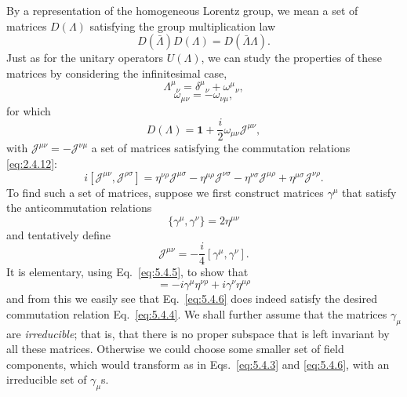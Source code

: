 By a representation of the homogeneous Lorentz group, we mean a set of
matrices $D(\Lambda)$ satisfying the group multiplication law
\[
D(\bar\Lambda)D(\Lambda)=D(\bar\Lambda\Lambda).
\]
Just as for the unitary operators $U(\Lambda)$, we can study the properties of
these matrices by considering the infinitesimal case,
\begin{equation}
\Lambda^\mu{}_\nu=\delta^\mu{}_\nu+\omega^\mu{}_\nu,
\tag{5.4.1}\label{eq:5.4.1}
\end{equation}
\begin{equation}
\omega_{\mu\nu}=-\omega_{\nu\mu},
\tag{5.4.2}\label{eq:5.4.2}
\end{equation}
for which
\begin{equation}
D(\Lambda)=\mathbf{1}+\frac{i}{2}\omega_{\mu\nu}\mathcal{J}^{\mu\nu},
\tag{5.4.3}\label{eq:5.4.3}
\end{equation}
with $\mathcal{J}^{\mu\nu}=-\mathcal{J}^{\nu\mu}$ a set of matrices satisfying
the commutation relations \eqref{eq:2.4.12}:
\begin{equation}
i[\mathcal{J}^{\mu\nu},\mathcal{J}^{\rho\sigma}]
=\eta^{\nu\rho}\mathcal{J}^{\mu\sigma}
-\eta^{\mu\rho}\mathcal{J}^{\nu\sigma}
-\eta^{\nu\sigma}\mathcal{J}^{\mu\rho}
+\eta^{\mu\sigma}\mathcal{J}^{\nu\rho}.
\tag{5.4.4}\label{eq:5.4.4}
\end{equation}
To find such a set of matrices, suppose we first construct matrices $\gamma^\mu$
that satisfy the anticommutation relations
\begin{equation}
\{\gamma^\mu,\gamma^\nu\}=2\eta^{\mu\nu}
\tag{5.4.5}\label{eq:5.4.5}
\end{equation}
and tentatively define
\begin{equation}
\mathcal{J}^{\mu\nu}=-\frac{i}{4}[\gamma^\mu,\gamma^\nu].
\tag{5.4.6}\label{eq:5.4.6}
\end{equation}
It is elementary, using Eq.~\eqref{eq:5.4.5}, to show that
\begin{equation}
[\mathcal{J}^{\mu\nu},\gamma^\rho]
=-i\gamma^\mu\eta^{\nu\rho}+i\gamma^\nu\eta^{\mu\rho}
\tag{5.4.7}\label{eq:5.4.7}
\end{equation}
and from this we easily see that Eq.~\eqref{eq:5.4.6} does indeed satisfy the desired
commutation relation Eq.~\eqref{eq:5.4.4}. We shall further assume that the matrices
$\gamma_\mu$ are \emph{irreducible}; that is, that there is no proper subspace
that is left invariant by all these matrices. Otherwise we could choose some
smaller set of field components, which would transform as in Eqs.~\eqref{eq:5.4.3} and
\eqref{eq:5.4.6}, with an irreducible set of $\gamma_\mu$s.

